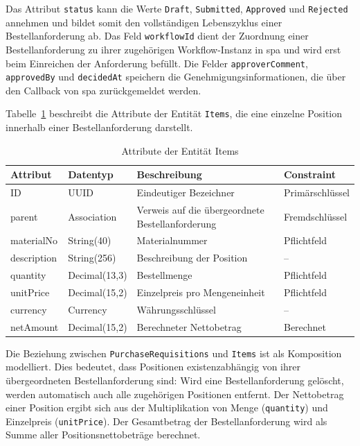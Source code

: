 Das Attribut \texttt{status} kann die Werte \texttt{Draft}, \texttt{Submitted}, \texttt{Approved} und \texttt{Rejected} annehmen und bildet somit den vollständigen Lebenszyklus einer Bestellanforderung ab. Das Feld \texttt{workflowId} dient der Zuordnung einer Bestellanforderung zu ihrer zugehörigen Workflow-Instanz in \gls{spa} und wird erst beim Einreichen der Anforderung befüllt. Die Felder \texttt{approverComment}, \texttt{approvedBy} und \texttt{decidedAt} speichern die Genehmigungsinformationen, die über den Callback von \gls{spa} zurückgemeldet werden.

Tabelle~\ref{tab:entity-items} beschreibt die Attribute der Entität \texttt{Items}, die eine einzelne Position innerhalb einer Bestellanforderung darstellt.

\begin{table}[H]
  \centering
  \caption{Attribute der Entität Items}
  \label{tab:entity-items}
  \begin{tabularx}{\textwidth}{l l X l}
    \hline
    \textbf{Attribut} & \textbf{Datentyp} & \textbf{Beschreibung} & \textbf{Constraint} \\
    \hline
    ID            & UUID            & Eindeutiger Bezeichner       & Primärschlüssel \\
    parent        & Association     & Verweis auf die übergeordnete Bestellanforderung & Fremdschlüssel \\
    materialNo    & String(40)      & Materialnummer               & Pflichtfeld \\
    description   & String(256)     & Beschreibung der Position    & -- \\
    quantity      & Decimal(13,3)   & Bestellmenge                 & Pflichtfeld \\
    unitPrice     & Decimal(15,2)   & Einzelpreis pro Mengeneinheit & Pflichtfeld \\
    currency      & Currency        & Währungsschlüssel            & -- \\
    netAmount     & Decimal(15,2)   & Berechneter Nettobetrag      & Berechnet \\
    \hline
  \end{tabularx}
\end{table}

Die Beziehung zwischen \texttt{PurchaseRequisitions} und \texttt{Items} ist als Komposition modelliert. Dies bedeutet, dass Positionen existenzabhängig von ihrer übergeordneten Bestellanforderung sind: Wird eine Bestellanforderung gelöscht, werden automatisch auch alle zugehörigen Positionen entfernt. Der Nettobetrag einer Position ergibt sich aus der Multiplikation von Menge (\texttt{quantity}) und Einzelpreis (\texttt{unitPrice}). Der Gesamtbetrag der Bestellanforderung wird als Summe aller Positionsnettobeträge berechnet.

